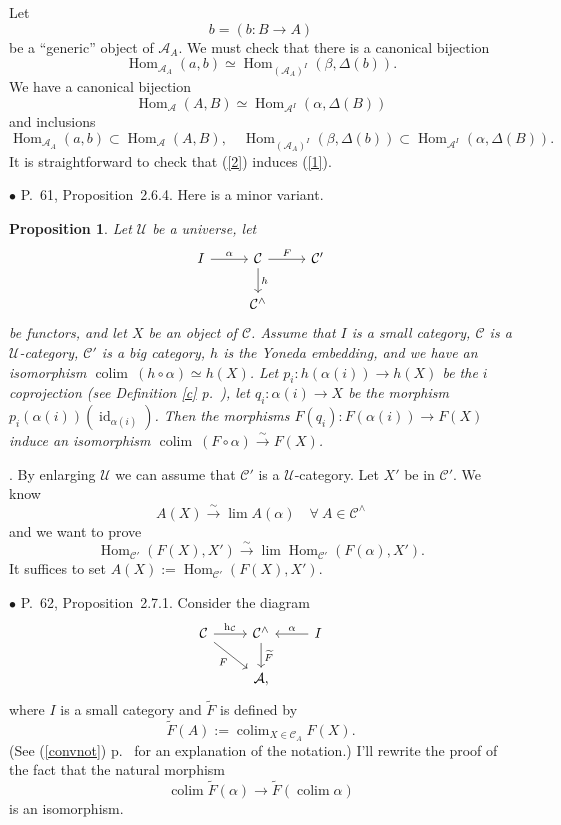 \documentclass[12pt]{article}
\newtheorem{prop}[thm]{Proposition}
\theoremstyle{remark}%
\newcommand{\bu}{\bullet}
\newcommand{\n}{\noindent}
\newcommand{\A}{\mathcal A}
\newcommand{\C}{\mathcal C}
\newcommand{\U}{\mathcal U}
\newcommand{\bp}{\begin{prop}}
\newcommand{\ep}{\end{prop}}
\newcommand{\pr}{Proposition}
\newcommand{\cn}{(See (\ref{convnot}) p.~\pageref{convnot} for an explanation of the notation.) }
\DeclareMathOperator*{\coli}{colim}
\DeclareMathOperator*{\co}{colim}
\DeclareMathOperator{\hy}{h}
\DeclareMathOperator{\id}{id}
\DeclareMathOperator{\Hom}{Hom}
\DeclareMathOperator{\h}{Hom}
\begin{document}
Let
$$
b=(b:B\to A)
$$
be a ``generic'' object of $\A_A$. We must check that there is a canonical bijection
%
\begin{equation}\label{1}
\Hom_{\A_A}(a,b)\simeq\Hom_{(\A_A)^I}(\beta,\Delta(b)).
\end{equation}
%
We have a canonical bijection  
%
\begin{equation}\label{2}
\Hom_\A(A,B)\simeq\Hom_{\A^I}(\alpha,\Delta(B))
\end{equation}
%
and inclusions  
$$
\Hom_{\A_A}(a,b)\subset\Hom_\A(A,B),\quad
%
\Hom_{(\A_A)^I}(\beta,\Delta(b))\subset\Hom_{\A^I}(\alpha,\Delta(B)).
$$
It is straightforward to check that (\ref{2}) induces (\ref{1}). 


\n$\bu$ P.~61, \pr\ 2.6.4. Here is a minor variant. 
%
\bp\label{264}
Let $\U$ be a universe, let  
$$
\begin{tikzcd}
I\ar{r}{\alpha}&\C\ar{d}{h}\ar{r}{F}&\C'\\
&\C^\wedge
\end{tikzcd}
$$ 
be functors, and let $X$ be an object of $\C$. Assume that $I$ is a small category, $\C$ is a $\U$-category, $\C'$ is a big category, $h$ is the Yoneda embedding, and we have an isomorphism $\co\ (h\circ\alpha)\simeq h(X)$. Let $p_i:h(\alpha(i))\to h(X)$ be the $i$ coprojection (see Definition \ref{c} p.~\pageref{c}), let $q_i:\alpha(i)\to X$ be the morphism $p_i(\alpha(i))(\id_{\alpha(i)})$. Then the morphisms $F(q_i):F(\alpha(i))\to F(X)$ induce an isomorphism $\co\ (F\circ\alpha)\xrightarrow\sim F(X)$.  
\ep
% 
\n{\em Proof}. By enlarging $\U$ we can assume that $\C'$ is a $\U$-category. Let $X'$ be in $\C'$. We know 
$$
A(X)\xrightarrow\sim\lim A(\alpha)\quad\forall\ A\in\C^\wedge 
$$ 
and we want to prove 
$$
\h_{\C'}(F(X),X')\xrightarrow\sim\lim\h_{\C'}(F(\alpha),X'). 
$$ 
It suffices to set $A(X):=\h_{\C'}(F(X),X')$. 


\n$\bu$ P.~62, \pr\ 2.7.1. Consider the diagram 
%
\begin{equation}\label{271b}
\begin{tikzcd}
\C\ar{r}{\hy_\C}\ar{dr}[swap]{F}&\C^\wedge\ar{d}{\widetilde F}&I\ar{l}[swap]{\alpha}\\
&\A,
\end{tikzcd}
\end{equation} 
% 
where $I$ is a small category and $\widetilde F$ is defined by 
$$
\widetilde F(A):=\coli_{X\in\C_A}F(X). 
$$
\cn I'll rewrite the proof of the fact that the natural morphism 
%
$$
\coli\widetilde F(\alpha)\to
\widetilde F\left(\coli\alpha\right) 
$$ 
% 
is an isomorphism. 
\end{document}
